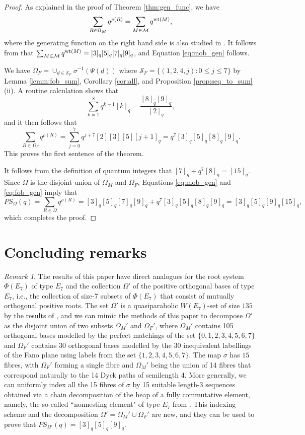 \documentclass[11pt]{amsart}
\theoremstyle{plain}
\theoremstyle{definition}
\theoremstyle{remark}
\newtheorem{rmk}[theorem]{Remark}
\numberwithin{equation}{section}
\newcommand{\seqd}{\underline{d}}
\newcommand{\calm}{\mathcal{M}}
\newcommand{\cals}{\mathcal{S}}
\newcommand{\ob}{\Omega}
\newcommand{\fob}{\Omega_F}
\newcommand{\mob}{\Omega_M}
\DeclareMathOperator{\wt}{\rm{wt}}
\newcommand{\inverse}{^{-1}}
\begin{document}
\begin{proof}
  As explained in the proof of Theorem \ref{thm:gen_func}, we have  
  \[
    \sum_{R\in \mob}q^{\rho(R)} = \sum_{M\in \calm}q^{\wt(M)}, 
  \]
  where the generating function on the right hand side is also studied in
  \cite{watson14}. It follows from \cite[Theorem 1]{watson14} that $\sum_{M\in
  \calm}q^{\wt(M)}=[3]_q[5]_q[7]_q[9]_q$, and Equation \eqref{eq:mob_gen}
  follows. 
 
  We have $\fob=\cup_{\seqd\in \cals_F} \sigma\inverse(\Psi(\seqd))$ where
  $\cals_F=\{(1,2,4,j): 0\le j \le 7\}$  by Lemma
  \ref{lemm:fob_sum}, Corollary \ref{cor:all}, and Proposition
  \ref{prop:seq_to_sum} (ii). A routine calculation shows that 
  \[
  \sum_{k=1}^8 q^{k-1}[k]_q = \frac{[8]_q[9]_q}{[2]_q}, 
  \]
and it then follows that
\[
\sum_{R\in \fob}q^{\rho(R)} = \sum_{j=0}^7
q^{j+7}[2][3][5][j+1]_q=q^7[3]_q[5]_q[8]_q[9]_q.
\]
This proves the first sentence of the theorem.

  It follows from the definition of quantum integers that
  $[7]_q+q^7[8]_q=[15]_q$. Since $\ob$ is the disjoint union of $\mob$ and
  $\fob$, Equations \eqref{eq:mob_gen} and \eqref{eq:fob_gen} imply that
  \[
    PS_\ob(q)=\sum_{R\in\ob}q^{\rho(R)}
    =[3]_q[5]_q[7]_q[9]_q
    + q^7[3]_q[5]_q[8]_q[9]_q=[3]_q[5]_q[9]_q[15]_q,
  \]
  which completes the proof.
\end{proof}


\section{Concluding remarks}
\label{sec:conclude}


\begin{rmk}\label{rmk:e7}
The results of this paper have direct analogues for the root system
$\Phi(E_7)$ of type $E_7$ and the collection $\ob'$ of the positive orthogonal
bases of type $E_7$, i.e., the collection of size-7 subsets of $\Phi(E_7)$ that
consist of
mutually orthogonal positive roots. The set $\ob'$ is a quasiparabolic
$W(E_7)$-set of size $135$ by the results of \cite{gx5,gx6}, and we can mimic
the methods of this paper to decompose $\ob'$ as the disjoint union of two
subsets $\mob'$ and $\fob'$, where $\mob'$ contains 105 orthogonal bases modelled by the perfect
matchings of the set $\{0,1,2,3,4,5,6,7\}$ and $\fob'$ contains 30
orthogonal bases modelled by the 30 inequivalent labellings of the Fano plane using
labels from the set $\{1,2,3,4,5,6,7\}$. The map $\sigma$ has $15$ fibres, 
with $\fob'$ forming a single fibre and 
$\mob'$ being the union of 14 fibres that correspond naturally to the 14 Dyck
paths of semilength 4. More generally, we can uniformly index all the 15 fibres
of $\sigma$ by 15 suitable length-3 sequences
obtained via a chain decomposition of the heap of a fully commutative
element, namely, the so-called ``nonnesting element" of type $E_7$ from
\cite[Section 6.2]{gx5}. This indexing scheme and the 
decomposition $\ob'=\mob'\cup \fob'$ are new, and they can be used to prove that
$PS_{\ob'}(q)=[3]_q [5]_q [9]_q$.
\end{rmk}
\end{document}
